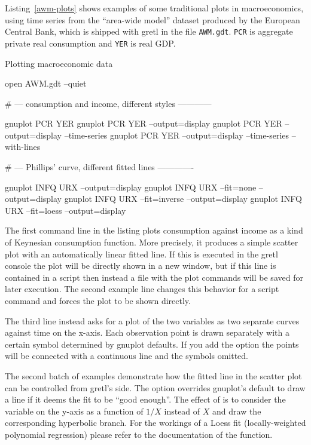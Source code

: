 Listing~\ref{awm-plots} shows examples of some traditional plots in macroeconomics,
using time series from the ``area-wide model'' dataset produced by the 
European Central Bank, which is shipped with gretl in the file \texttt{AWM.gdt}.
\texttt{PCR} is aggregate private real consumption and \texttt{YER} is real GDP.

\begin{script}
  \caption{Plotting macroeconomic data}
  \label{awm-plots}
\begin{scode}
open AWM.gdt --quiet

# --- consumption and income, different styles ------------

gnuplot PCR YER
gnuplot PCR YER --output=display
gnuplot PCR YER --output=display --time-series
gnuplot PCR YER --output=display --time-series --with-lines

# --- Phillips' curve, different fitted lines -------------

gnuplot INFQ URX --output=display
gnuplot INFQ URX --fit=none --output=display
gnuplot INFQ URX --fit=inverse --output=display
gnuplot INFQ URX --fit=loess --output=display
\end{scode}
\end{script}

The first command line in the listing
plots consumption against income as a kind of Keynesian 
consumption function. More precisely, it produces a simple scatter plot with
an automatically linear fitted line. If this is executed in the gretl console
the plot will be directly shown in a new window, but if this line is contained
in a script then instead a file with the plot commands will be saved for later
execution. The second example line changes this behavior for a script command
and forces the plot to be shown directly. 

The third line instead asks for a plot of the two variables as two separate
curves against time on the x-axis. Each observation point is drawn separately
with a certain symbol determined by gnuplot defaults. If you add the option
 the points will be connected with a continuous line and the
symbols omitted.

The second batch of examples demonstrate how the fitted line in the 
scatter plot can be controlled from gretl's side. The option 
overrides gnuplot's default to draw a line if it deems the fit to be ``good
enough''. The effect of  is to consider the variable on the
y-axis as a function of $1/X$ instead of $X$ and draw the corresponding
hyperbolic branch. For the workings of a Loess fit (locally-weighted polynomial 
regression) please refer to the documentation of the  function.

